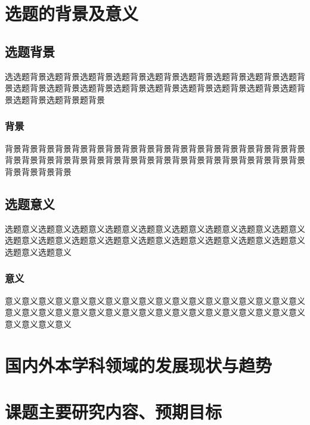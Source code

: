 \section{选题的背景及意义}

\subsection{选题背景}

选选题背景选题背景选题背景选题背景选题背景选题背景选题背景选题背景选题背景选题背景选题背景选题背景选题背景选题背景选题背景选题背景选题背景选题背景选题背景选题背景题背景

\subsubsection{背景}

背景背景背景背景背景背景背景背景背景背景背景背景背景背景背景背景背景背景背景背景背景背景背景背景背景背景背景背景背景背景背景背景背景背景背景背景背景背景背景背景

\subsection{选题意义}

选题意义选题意义选题意义选题意义选题意义选题意义选题意义选题意义选题意义选题意义选题意义选题意义选题意义选题意义选题意义选题意义选题意义选题意义选题意义选题意义

\subsubsection{意义}

意义意义意义意义意义意义意义意义意义意义意义意义意义意义意义意义意义意义意义意义意义意义意义意义意义意义意义意义意义意义意义意义意义意义意义意义意义意义意义意义

\section{国内外本学科领域的发展现状与趋势}

\section{课题主要研究内容、预期目标}


